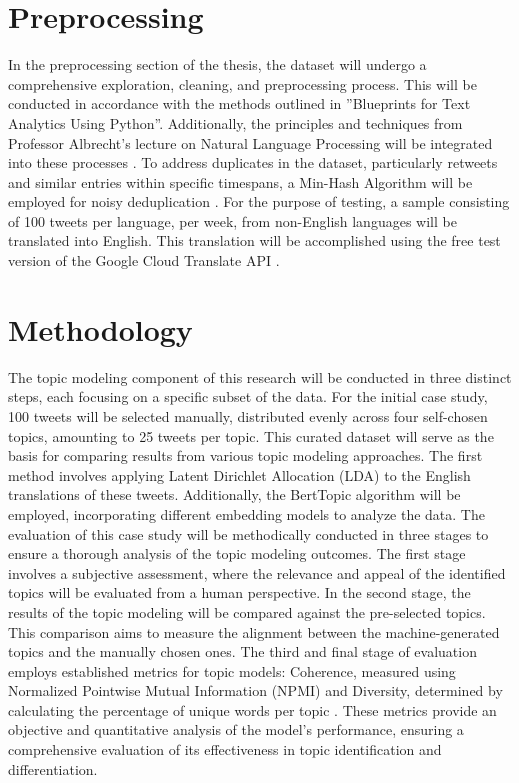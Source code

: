 \documentclass[
    11pt,
    a4paper,
    egregdoesnotlikesansseriftitles,
    toc=chapterentrywithdots,
    oneside,openright,
    titlepage,
    parskip=half,
    headings=normal,  %
    listof=totoc,
    bibliography=totoc,
    index=totoc,
    captions=tableheading,  %
    chapterprefix,
    listof=flat,
    final
]{scrbook}
\begin{document}
{\let\clearpage\relax \chapter{Preprocessing}}
In the preprocessing section of the thesis, the dataset will undergo a comprehensive exploration, cleaning, and preprocessing process. This will be conducted in accordance with the methods outlined in ''Blueprints for Text Analytics Using Python''. Additionally, the principles and techniques from Professor Albrecht's lecture on Natural Language Processing will be integrated into these processes \cite{Albrecht}.
To address duplicates in the dataset, particularly retweets and similar entries within specific timespans, a Min-Hash Algorithm will be employed for noisy deduplication \cite{Dedupl}.
For the purpose of testing, a sample consisting of 100 tweets per language, per week, from non-English languages will be translated into English. This translation will be accomplished using the free test version of the Google Cloud Translate API  \cite{GoogleTranslateApi}.

{\let\clearpage\relax \chapter{Methodology}}

The topic modeling component of this research will be conducted in three distinct steps, each focusing on a specific subset of the data. For the initial case study, 100 tweets will be selected manually, distributed evenly across four self-chosen topics, amounting to 25 tweets per topic. This curated dataset will serve as the basis for comparing results from various topic modeling approaches. The first method involves applying Latent Dirichlet Allocation (LDA) \cite{LDA} to the English translations of these tweets. Additionally, the BertTopic \cite{BERTopic} algorithm will be employed, incorporating different embedding models to analyze the data.
The evaluation of this case study will be methodically conducted in three stages to ensure a thorough analysis of the topic modeling outcomes. The first stage involves a subjective assessment, where the relevance and appeal of the identified topics will be evaluated from a human perspective. In the second stage, the results of the topic modeling will be compared against the pre-selected topics. This comparison aims to measure the alignment between the machine-generated topics and the manually chosen ones. The third and final stage of evaluation employs established metrics for topic models: Coherence, measured using Normalized Pointwise Mutual Information (NPMI)\cite{npmi} and Diversity, determined by calculating the percentage of unique words per topic \cite{diversity}. These metrics provide an objective and quantitative analysis of the model's performance, ensuring a comprehensive evaluation of its effectiveness in topic identification and differentiation.
\end{document}

